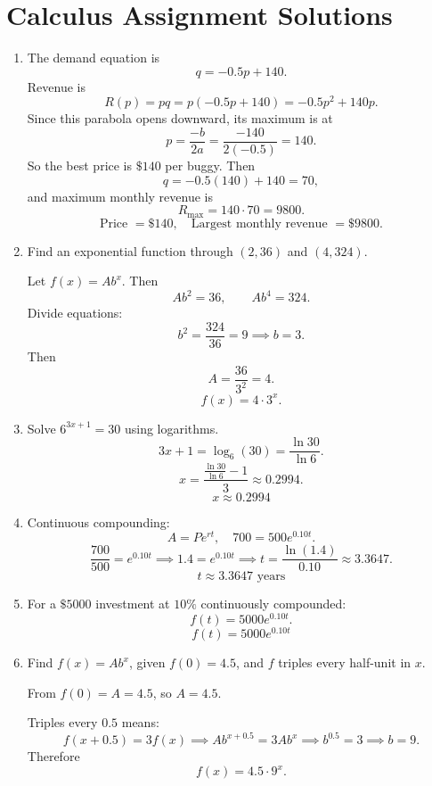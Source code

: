 \documentclass[12pt]{article}
\begin{document}
\section*{Calculus Assignment Solutions}

\begin{enumerate}
  \item The demand equation is
  \[
    q=-0.5p+140.
  \]
  Revenue is
  \[
    R(p)=pq=p(-0.5p+140)=-0.5p^2+140p.
  \]
  Since this parabola opens downward, its maximum is at
  \[
    p=\frac{-b}{2a}=\frac{-140}{2(-0.5)}=140.
  \]
  So the best price is \(\$140\) per buggy. Then
  \[
    q=-0.5(140)+140=70,
  \]
  and maximum monthly revenue is
  \[
    R_{\max}=140\cdot 70=9800.
  \]
  \[
    \boxed{\text{Price }=\$140,\quad \text{Largest monthly revenue }=\$9800.}
  \]

  \item Find an exponential function through \((2,36)\) and \((4,324)\).

  Let \(f(x)=Ab^x\). Then
  \[
    Ab^2=36,\qquad Ab^4=324.
  \]
  Divide equations:
  \[
    b^2=\frac{324}{36}=9 \implies b=3.
  \]
  Then
  \[
    A=\frac{36}{3^2}=4.
  \]
  \[
    \boxed{f(x)=4\cdot 3^x.}
  \]

  \item Solve \(6^{3x+1}=30\) using logarithms.
  \[
    3x+1=\log_6(30)=\frac{\ln 30}{\ln 6}.
  \]
  \[
    x=\frac{\frac{\ln 30}{\ln 6}-1}{3}\approx 0.2994.
  \]
  \[
    \boxed{x\approx 0.2994}
  \]

  \item Continuous compounding:
  \[
    A=Pe^{rt},\quad 700=500e^{0.10t}.
  \]
  \[
    \frac{700}{500}=e^{0.10t}\implies 1.4=e^{0.10t}
    \implies t=\frac{\ln(1.4)}{0.10}\approx 3.3647.
  \]
  \[
    \boxed{t\approx 3.3647\text{ years}}
  \]

  \item For a \(\$5000\) investment at \(10\%\) continuously compounded:
  \[
    f(t)=5000e^{0.10t}.
  \]
  \[
    \boxed{f(t)=5000e^{0.10t}}
  \]

  \item Find \(f(x)=Ab^x\), given \(f(0)=4.5\), and \(f\) triples every half-unit in \(x\).

  From \(f(0)=A=4.5\), so \(A=4.5\).

  Triples every \(0.5\) means:
  \[
    f(x+0.5)=3f(x)\implies Ab^{x+0.5}=3Ab^x\implies b^{0.5}=3\implies b=9.
  \]
  Therefore
  \[
    \boxed{f(x)=4.5\cdot 9^x.}
  \]
\end{enumerate}
\end{document}
